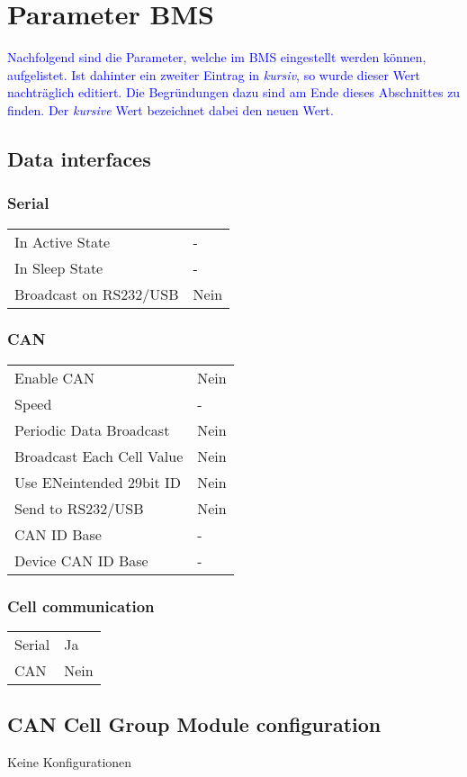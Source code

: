 \chapter{Parameter BMS}\label{anh_bms}
\textcolor{blue}{Nachfolgend sind die Parameter, welche im BMS eingestellt werden können, aufgelistet. Ist dahinter ein zweiter Eintrag in \textit{kursiv}, so wurde dieser Wert nachträglich editiert. Die Begründungen dazu sind am Ende dieses Abschnittes zu finden. Der \textit{kursive} Wert bezeichnet dabei den neuen Wert.}
\section*{Data interfaces}
\subsection*{Serial}
\begin{tabular}{p{11cm}p{2cm}}
	In Active State & - \\
	In Sleep State & - \\
	Broadcast on RS232/USB & Nein
\end{tabular}

\subsection*{CAN}
\begin{tabular}{p{11cm}p{2cm}}
	Enable CAN & Nein \\
	Speed & - \\
	Periodic Data Broadcast & Nein \\
	Broadcast Each Cell Value & Nein \\
	Use ENeintended 29bit ID & Nein \\
	Send to RS232/USB & Nein \\
	CAN ID Base & - \\
	Device CAN ID Base & -
\end{tabular}

\subsection*{Cell communication}
\begin{tabular}{p{11cm}p{2cm}}
	Serial & Ja \\
	CAN & Nein
\end{tabular}

\section*{CAN Cell Group Module configuration}
Keine Konfigurationen

